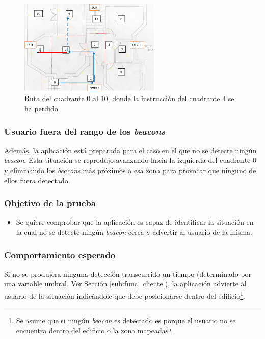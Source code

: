 \begin{figure}[t!]
	\centering
	\includegraphics[width=0.6\textwidth]{Imagenes/Evaluacion/del0al10sin4perdido}
	\caption{Ruta del cuadrante $0$ al $10$, donde la instrucción del cuadrante $4$ se ha perdido.}
	\label{fig:del0al10sin4perdido}
\end{figure}


\subsubsection{Usuario fuera del rango de los \textit{beacons}}

Además, la aplicación está preparada para el caso en el que no se detecte ningún \textit{beacon}. Esta situación se reprodujo avanzando hacia la izquierda del cuadrante $0$ y eliminando los \textit{beacons} más próximos a esa zona para provocar que ninguno de ellos fuera detectado.

\subsubsection*{Objetivo de la prueba}

\begin{itemize}
	\item Se quiere comprobar que la aplicación es capaz de identificar la situación en la cual no se detecte ningún \textit{beacon} cerca y advertir al usuario de la misma. 
\end{itemize}

\subsubsection*{Comportamiento esperado}

 Si no se produjera ninguna detección transcurrido un tiempo (determinado por una variable umbral. Ver Sección \ref{sub:func_cliente}), la aplicación advierte al usuario de la situación indicándole que debe posicionarse dentro del edificio\footnote{Se asume que si ningún \textit{beacon} es detectado es porque el usuario no se encuentra dentro del edificio o la zona mapeada}. 
 
